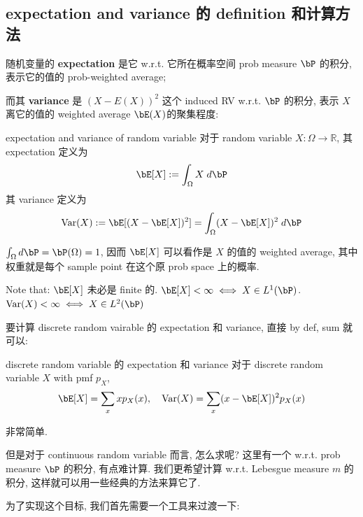 \subsection{expectation and variance 的 definition 和计算方法}
随机变量的 \textbf{expectation} 是它 w.r.t. 它所在概率空间 prob measure \(\bP\) 的积分, 
表示它的值的 prob-weighted average; 

而其 \textbf{variance} 是 $(X-E(X))^2$ 这个 induced RV w.r.t. \(\bP\) 的积分, 
表示 \(X\) 离它的值的 weighted average \(\bE(X)\)的聚集程度:

\begin{definition}{expectation and variance of random variable}
    对于 random variable \(X: \Omega \to \mathbb{R}\), 
    其 expectation 定义为
    \[
    \bE[X] := \int_\Omega X \;d\bP
    \]
    其 variance 定义为
    \[
    \text{Var}(X) := \bE[(X-\bE[X])^2] = \int_\Omega (X-\bE[X])^2   \;d\bP
    \]
    
\end{definition}

\begin{remark}
    \(\int_{\Omega} d\bP = \bP(\Omega) =  1\), 因而
     \(\bE[X]\) 可以看作是 \(X\) 的值的 weighted average, 
     其中权重就是每个 sample point 在这个原 prob space 上的概率.

     Note that: \(\bE[X]\) 未必是 finite 的. \(\bE[X] < \infty \iff X \in L^1(\bP)\). 
     \(\text{Var}(X) < \infty \iff X \in L^2(\bP)\)
\end{remark}
要计算 discrete random vairable 的 expectation 和 variance, 直接 by def, sum 就可以:
\begin{proposition}{discrete random variable 的 expectation 和 variance}\label{discrete random variable 的 expectation 和 variance}
    对于 discrete random variable \(X\) with pmf \(p_X\), 
    \[
    \bE[X] = \sum_{x} x p_X(x), \quad \text{Var}(X) = \sum_{x} (x-\bE[X])^2 p_X(x)
    \]
\end{proposition}
非常简单. 

但是对于 continuous random variable 而言, 怎么求呢? 这里有一个 w.r.t. prob measure \(\bP\) 的积分, 
有点难计算. 我们更希望计算 w.r.t. Lebesgue measure \(m\) 的积分,
这样就可以用一些经典的方法来算它了.

为了实现这个目标, 我们首先需要一个工具来过渡一下:

